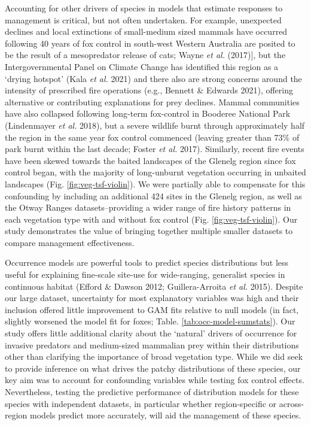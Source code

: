 \documentclass[]{elsarticle} %
\begin{document}
Accounting for other drivers of species in models that estimate responses to management is critical, but not often undertaken. For example, unexpected declines and local extinctions of small-medium sized mammals have occurred following 40 years of fox control in south-west Western Australia are posited to be the result of a mesopredator release of cats; Wayne \emph{et al.} (2017){]}, but the Intergovernmental Panel on Climate Change has identified this region as a `drying hotspot' (Kala \emph{et al.} 2021) and there also are strong concerns around the intensity of prescribed fire operations (e.g., Bennett \& Edwards 2021), offering alternative or contributing explanations for prey declines. Mammal communities have also collapsed following long-term fox-control in Booderee National Park (Lindenmayer \emph{et al.} 2018), but a severe wildlife burnt through approximately half the region in the same year fox control commenced (leaving greater than 73\% of park burnt within the last decade; Foster \emph{et al.} 2017). Similarly, recent fire events have been skewed towards the baited landscapes of the Glenelg region since fox control began, with the majority of long-unburnt vegetation occurring in unbaited landscapes (Fig. \ref{fig:veg-tsf-violin}). We were partially able to compensate for this confounding by including an additional 424 sites in the Glenelg region, as well as the Otway Ranges datasets--providing a wider range of fire history patterns in each vegetation type with and without fox control (Fig. \ref{fig:veg-tsf-violin}). Our study demonstrates the value of bringing together multiple smaller datasets to compare management effectiveness.

Occurrence models are powerful tools to predict species distributions but less useful for explaining fine-scale site-use for wide-ranging, generalist species in continuous habitat (Efford \& Dawson 2012; Guillera-Arroita \emph{et al.} 2015). Despite our large dataset, uncertainty for most explanatory variables was high and their inclusion offered little improvement to GAM fits relative to null models (in fact, slightly worsened the model fit for foxes; Table. \ref{tab:occ-model-sumstats}). Our study offers little additional clarity about the `natural' drivers of occurrence for invasive predators and medium-sized mammalian prey within their distributions other than clarifying the importance of broad vegetation type. While we did seek to provide inference on what drives the patchy distributions of these species, our key aim was to account for confounding variables while testing fox control effects. Nevertheless, testing the predictive performance of distribution models for these species with independent datasets, in particular whether region-specific or across-region models predict more accurately, will aid the management of these species.
\end{document}
